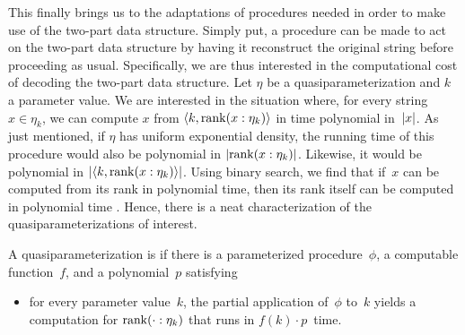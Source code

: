This finally brings us to the adaptations of procedures needed in order to make use of the two-part data structure.
Simply put, a procedure can be made to act on the two-part data structure by having it reconstruct the original string before proceeding as usual.
Specifically, we are thus interested in the computational cost of decoding the two-part data structure.
Let $\eta$ be a quasiparameterization and $k$ a parameter value.
We are interested in the situation where, for every string~$x \in \eta_k$, we can compute $x$ from ${\langle k, \operatorname{rank}(x : \eta_k)\rangle}$ in time polynomial in~${\lvert x\rvert}$.
As just mentioned, if $\eta$ has uniform exponential density, the running time of this procedure would also be polynomial in ${\lvert\operatorname{rank}(x : \eta_k)\rvert}$.
Likewise, it would be polynomial in ${\lvert{\langle k, \operatorname{rank}(x : \eta_k)\rangle}\rvert}$.
Using binary search, we find that if~$x$ can be computed from its rank in polynomial time, then its rank itself can be computed in polynomial time \parencite[][Theorem~6.1]{hemachandra1990complexity}.
Hence, there is a neat characterization of the quasiparameterizations of interest.
\begin{definition}
  A quasiparameterization is  if there is a parameterized procedure~$\phi$, a computable function~$f$, and a polynomial~$p$ satisfying
  \begin{itemize}
  \item for every parameter value~$k$, the partial application of~$\phi$ to~$k$ yields a computation for $\operatorname{rank}(\cdot : \eta_k)$ that runs in $f(k) \cdot p$~time.
  \end{itemize}
\end{definition}

